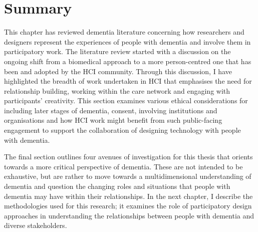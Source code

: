 \section{Summary}
\label{BL:summary}
This chapter has reviewed dementia literature concerning how researchers and designers represent the experiences of people with dementia and involve them in participatory work. The literature review started with a discussion on the ongoing shift from a biomedical approach to a more person-centred one that has been and adopted by the HCI community. Through this discussion, I have highlighted the breadth of work undertaken in HCI that emphasises the need for relationship building, working within the care network and engaging with participants' creativity. This section examines various ethical considerations for including later stages of dementia, consent, involving institutions and organisations and how HCI work might benefit from such public-facing engagement to support the collaboration of designing technology with people with dementia. 

The final section outlines four avenues of investigation for this thesis that orients towards a more critical perspective of dementia. These are not intended to be exhaustive, but are rather to move towards a multidimensional understanding of dementia and question the changing roles and situations that people with dementia may have within their relationships. In the next chapter, I describe the methodologies used for this research; it examines the role of participatory design approaches in understanding the relationships between people with dementia and diverse stakeholders.
